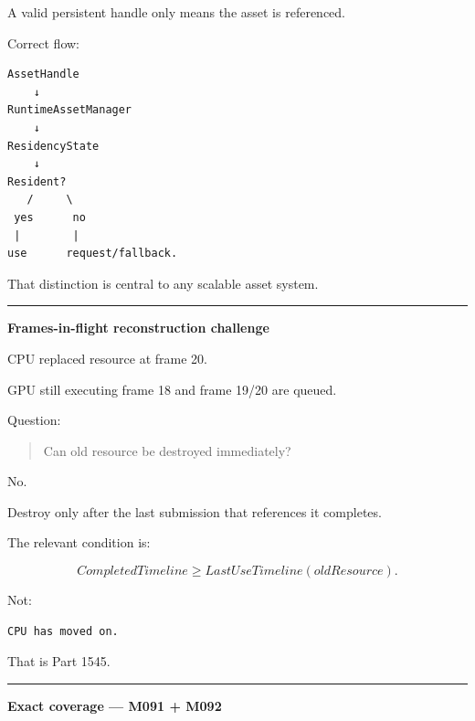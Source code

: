 A valid persistent handle only means the asset is referenced.

Correct flow:

\begin{verbatim}
AssetHandle
    ↓
RuntimeAssetManager
    ↓
ResidencyState
    ↓
Resident?
   /     \
 yes      no
 |        |
use      request/fallback.
\end{verbatim}

That distinction is central to any scalable asset system.

\begin{center}\rule{0.5\linewidth}{0.5pt}\end{center}

\textbf{Frames-in-flight reconstruction challenge}

CPU replaced resource at frame 20.

GPU still executing frame 18 and frame 19/20 are queued.

Question:

\begin{quote}
Can old resource be destroyed immediately?
\end{quote}

No.

Destroy only after the last submission that references it completes.

The relevant condition is:

\[
CompletedTimeline
\ge
LastUseTimeline(oldResource).
\]

Not:

\begin{verbatim}
CPU has moved on.
\end{verbatim}

That is Part 1545.

\begin{center}\rule{0.5\linewidth}{0.5pt}\end{center}

\textbf{Exact coverage --- M091 + M092}

